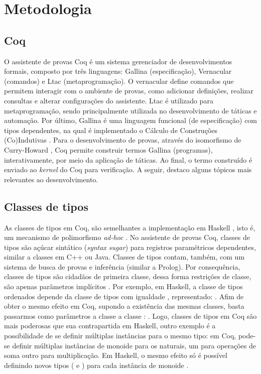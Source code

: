 \chapter{Metodologia}\label{chp:metodologia}

\section{Coq}
O assistente de provas Coq \cite{Coq2021} é um sistema gerenciador de desenvolvimentos formais, composto por três linguagens: Gallina (especificação), Vernacular (comandos) e Ltac (metaprogramação). O vernacular define comandos que permitem interagir com o ambiente de provas, como adicionar definições, realizar consultas e alterar configurações do assistente. Ltac é utilizado para metaprogramação, sendo principalmente utilizada no desenvolvimento de táticas e automação. Por último, Gallina é uma linguagem funcional (de especificação) com tipos dependentes, na qual é implementado o Cálculo de Construções (Co)Indutivas \cite{Coquand1988,Coquand1990,PaulinMohring1993}. Para o desenvolvimento de provas, através do isomorfismo de Curry-Howard \cite{Soerensen2006}, Coq permite construir termos Gallina (programas), interativamente, por meio da aplicação de táticas. Ao final, o termo construído é enviado ao \textit{kernel} do Coq para verificação. A seguir, destaco alguns tópicos mais relevantes ao desenvolvimento.

\section{Classes de tipos}\label{sec:classes}
As classes de tipos em Coq, são semelhantes a implementação em Haskell \cite{Hall1996}, isto é, um mecanismo de polimorfismo \textit{ad-hoc} \cite{Wadler1989}. No assistente de provas Coq, classes de tipos são açúcar sintático (\textit{syntax sugar}) para registros paramétricos dependentes, similar a classes em C++ ou Java. Classes de tipos contam, também, com um sistema de busca de provas e inferência (similar a Prolog). Por consequência, classes de tipos são cidadãos de primeira classe, dessa forma restrições de classe, são apenas parâmetros implícitos \cite{Sozeau2008}. Por exemplo, em Haskell, a classe de tipos ordenados depende da classe de tipos com igualdade \cite{HaskellOrd}, representado: . Afim de obter o mesmo efeito em Coq, supondo a existência das mesmas classes, basta passarmos como parâmetros a classe  a classe : . Logo, classes de tipos em Coq são mais poderosas que sua contrapartida em Haskell, outro exemplo é a possibilidade de se definir múltiplas instâncias para o mesmo tipo: em Coq, pode-se definir múltiplas instâncias de monoide para os naturais, um para operações de soma outro para multiplicação. Em Haskell, o mesmo efeito só é possível definindo novos tipos ( e ) para cada instância de monoide \cite{HaskellMonoid}.

